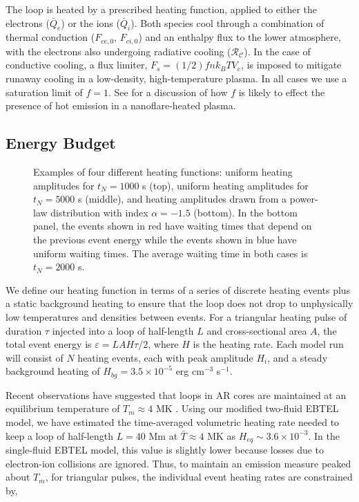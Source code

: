 \documentclass[preprint,linenumbers]{aastex}
\begin{document}
	\par The loop is heated by a prescribed heating function, applied to either the electrons ($\bar{Q}_e$) or the ions ($\bar{Q}_i$). Both species cool through a combination of thermal conduction ($F_{ce,0},\,F_{ci,0}$) and an enthalpy flux to the lower atmosphere, with the electrons also undergoing radiative cooling ($\mathcal{R_C}$). In the case of conductive cooling, a flux limiter, $F_s=(1/2)fnk_BTV_e$, is imposed to mitigate runaway cooling in a low-density, high-temperature plasma. In all cases we use a saturation limit of $f=1$. See  for a discussion of how $f$ is likely to effect the presence of hot emission in a nanoflare-heated plasma.
	\subsection{Energy Budget}
	\label{subsec:params}
	\begin{figure}
		\caption{Examples of four different heating functions: uniform heating amplitudes for $t_N=1000$ s (top), uniform heating amplitudes for $t_N=5000$ s (middle), and heating amplitudes drawn from a power-law distribution with index $\alpha=-1.5$ (bottom). In the bottom panel, the events shown in red have waiting times that depend on the previous event energy while the events shown in blue have uniform waiting times. The average waiting time in both cases is $t_N=2000$ s.}
		\label{fig:heating_funcs}
	\end{figure}
	\par We define our heating function in terms of a series of discrete heating events plus a static background heating to ensure that the loop does not drop to unphysically low temperatures and densities between events. For a triangular heating pulse of duration $\tau$ injected into a loop of half-length $L$ and cross-sectional area $A$, the total  event energy is $\varepsilon=LAH\tau/2$, where $H$ is the heating rate. Each model run will consist of $N$ heating events, each with peak amplitude $H_i$, and a steady background heating of $H_{bg}=3.5\times10^{-5}$ erg cm$^{-3}$ s$^{-1}$.
	\par Recent observations have suggested that loops in AR cores are maintained at an equilibrium temperature of $T_{m}\approx4$ MK \citep{warren_constraints_2011,warren_systematic_2012}. Using our modified two-fluid EBTEL model, we have estimated the time-averaged volumetric heating rate needed to keep a loop of half-length $L=40$ Mm at $\bar{T}\approx4$ MK as  $H_{eq}\sim3.6\times10^{-3}$. In the single-fluid EBTEL model, this value is slightly lower because losses due to electron-ion collisions are ignored. Thus, to maintain an emission measure peaked about $T_{m}$, for triangular pulses, the individual event heating rates are constrained by,
\end{document}
